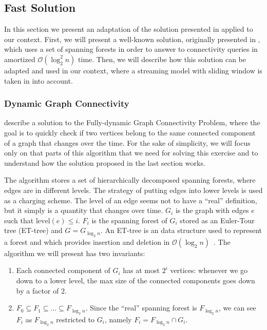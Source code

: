 \documentclass[12pt,a4paper]{article}
\begin{document}
\subsection*{Fast Solution}
In this section we present an adaptation of the solution presented in \cite{holm2001poly, mit, tor, stanford} applied to our context. First, we will present a well-known solution, originally presented in \cite{holm2001poly}, which uses a set of spanning forests in order to answer to connectivity queries in amortized $\mathcal{O}(\log_2^2 n)$ time. Then, we will describe how this solution can be adapted and used in our context, where a streaming model with sliding window is taken in into account.


\subsubsection*{Dynamic Graph Connectivity}

\cite{holm2001poly, mit, tor, stanford} describe a solution to the Fully-dynamic Graph Connectivity Problem, where the goal is to quickly check if two vertices belong to the same connected component of a graph that changes over the time. For the sake of simplicity, we will focus only on that parts of this algorithm that we need for solving this exercise and to understand how the solution proposed in the last section works.


The algorithm stores a set of hierarchically decomposed spanning forests, where edges are in different levels. The strategy of putting edges into lower levels is used as a charging scheme. The level of an edge seems not to have a ``real'' definition, but it simply is a quantity that changes over time. $G_i$ is the graph with edges $e$ such that $\text{level}(e) \leq i$. $F_i$ is the spanning forest of $G_i$ stored as an Euler-Tour tree (ET-tree) and $G = G_{\log_2 n}$. An ET-tree is an data structure used to represent a forest and which provides insertion and deletion in $\mathcal{O}(\log_2 n)$~\cite{stanford}. The algorithm we will present has two invariants:
\begin{enumerate}
\item Each connected component of $G_i$ has at most $2^i$ vertices: whenever we go down to a lower level, the max size of the connected components goes down by a factor of $2$.
\item  $F_0 \subseteq F_1 \subseteq \dots \subseteq F_{\log_2 n}$. Since the ``real'' spanning forest is $F_{\log_2 n}$, we can see $F_i$ as $F_{\log_2 n}$ restricted to $G_i$, namely $F_i = F_{\log_2 n} \cap G_i$.
\end{enumerate}
\end{document}
